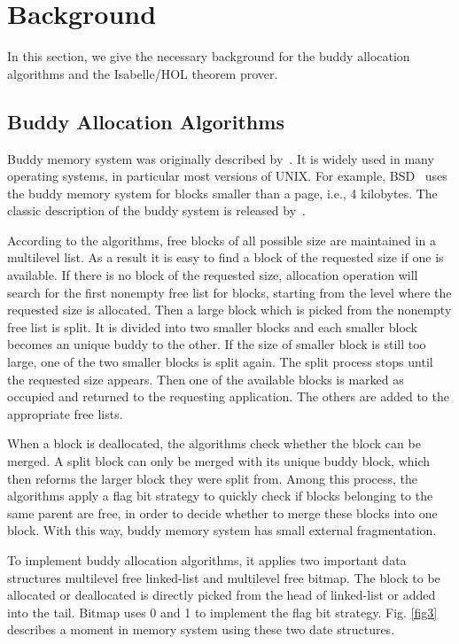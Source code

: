 \section{Background}
In this section, we give the necessary background for the buddy allocation algorithms and the Isabelle/HOL theorem prover.

\subsection{Buddy Allocation Algorithms}
Buddy memory system was originally described by~\cite{reg_knowlton}. It is widely used in many operating systems, in particular most versions of UNIX. For example, BSD~\cite{reg_mckusick} uses the buddy memory system for blocks smaller than a page, i.e., 4 kilobytes. The classic description of the buddy system is released by~\cite{reg_knuth}.

According to the algorithms, free blocks of all possible size are maintained in a multilevel list. As a result it is easy to find a block of the requested size if one is available. If there is no block of the requested size, allocation operation will search for the first nonempty free list for blocks, starting from the level where the requested size is allocated. Then a large block which is picked from the nonempty free list is split. It is divided into two smaller blocks and each smaller block becomes an unique buddy to the other. If the size of smaller block is still too large, one of the two smaller blocks is split again. The split process stops until the requested size appears. Then one of the available blocks is marked as occupied and returned to the requesting application. The others are added to the appropriate free lists.

When a block is deallocated, the algorithms check whether the block can be merged. A split block can only be merged with its unique buddy block, which then reforms the larger block they were split from. Among this process, the algorithms apply a flag bit strategy to quickly check if blocks belonging to the same parent are free, in order to decide whether to merge these blocks into one block. With this way, buddy memory system has small external fragmentation.

To implement buddy allocation algorithms, it applies two important data structures multilevel free linked-list and multilevel free bitmap. The block to be allocated or deallocated is directly picked from the head of linked-list or added into the tail. Bitmap uses 0 and 1 to implement the flag bit strategy. Fig. \ref{fig3} describes a moment in memory system using these two date structures.

